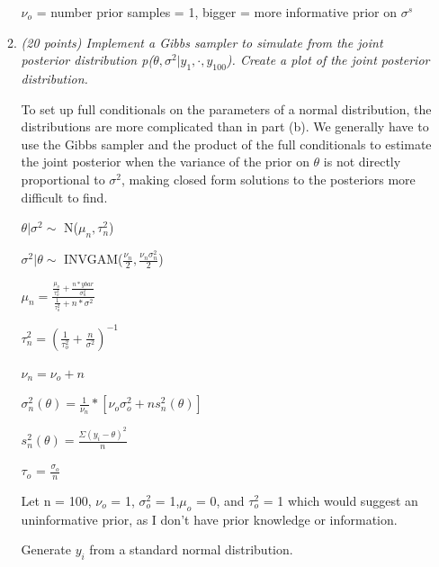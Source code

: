 \documentclass{article}\usepackage[]{graphicx}\usepackage[]{color}
\newenvironment{knitrout}{}{} %
\begin{document}
\begin{enumerate}
\begin{enumerate}
    $\nu_{o}$ = number prior samples = 1, bigger = more informative prior on $\sigma^s$
    
\item %
{\it (20 points) Implement a Gibbs sampler to simulate from the joint posterior distribution
p($\theta, \sigma^2 | y_{1}, \cdot, y_{100}$). Create a plot of the joint posterior distribution.}

To set up full conditionals on the parameters of a normal distribution, the distributions are more complicated than in part (b). We generally have to use the Gibbs sampler and the product of the full conditionals to estimate the joint posterior when the variance of the prior on $\theta$ is not directly proportional to $\sigma^2$, making closed form solutions to the posteriors more difficult to find.

$\theta | \sigma^2 \sim$ N($\mu_{n}, \tau_{n}^2$)

$\sigma^2 | \theta \sim$ INVGAM($\frac{\nu_{n}}{2}, \frac{\nu_{n}\sigma^2_{n}}{2}$)

$\mu_{n} = \frac{\frac{\mu_{o}}{\tau_{o}^2} + \frac{n*ybar}{\sigma^2_{n}}}{\frac{1}{\tau_{o}^2} + n*\sigma^2}$

$\tau^2_{n} = (\frac{1}{\tau_{o}^2} + \frac{n}{\sigma^2})^{-1}$

$\nu_{n} = \nu_{o} + n$

$\sigma^2_{n}(\theta) = \frac{1}{\nu_{n}}*[\nu_{o}\sigma_{o}^2 + ns^2_{n}(\theta)]$

$s^2_{n}(\theta) = \frac{\Sigma(y_{i} - \theta)^2}{n}$

$\tau_{o}$ = $\frac{\sigma_{o}}{n}$

Let n = 100, $\nu_{o}$ = 1, $\sigma^2_{o}$ = 1,$\mu_{o}$ = 0, and $\tau^2_{o}$ = 1 which would suggest an uninformative prior, as I don't have prior knowledge or information.

Generate $y_{i}$ from a standard normal distribution.



\begin{knitrout}
\color{fgcolor}


\end{knitrout}
\end{enumerate}
\end{enumerate}
\end{document}
